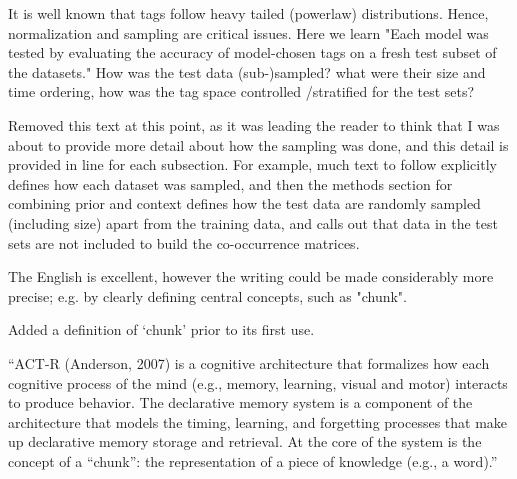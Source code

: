 \documentclass[answers,12pt]{exam}
\begin{document}
\begin{questions}
\begin{solution}
\end{solution}

\question It is well known that tags follow heavy tailed (powerlaw) distributions. Hence, normalization and sampling are critical issues. Here we learn "Each model was tested by evaluating the accuracy of model-chosen tags on a fresh test subset of the datasets." How was the test data (sub-)sampled? what were their size and time ordering, how was the tag space controlled /stratified for the test sets?

\begin{solution}
Removed this text at this point, as it was leading the reader to think that I was about to provide more detail about how the sampling was done, and this detail is provided in line for each subsection. For example, much text to follow explicitly defines how each dataset was sampled, and then the methods section for combining prior and context defines how the test data are randomly sampled (including size) apart from the training data, and calls out that data in the test sets are not included to build the co-occurrence matrices.

\end{solution}

\question The English is excellent, however the writing could be made considerably more precise; e.g. by clearly defining central concepts, such as "chunk".

\begin{solution}
Added a definition of ‘chunk’ prior to its first use.

``ACT-R (Anderson, 2007) is a cognitive architecture that formalizes how each cognitive process of the mind (e.g., memory, learning, visual and motor) interacts to produce behavior. The declarative memory system is a component of the architecture that models the timing, learning, and forgetting processes that make up declarative memory storage and retrieval. At the core of the system is the concept of a “chunk”: the representation of a piece of knowledge (e.g., a word).''

\end{solution}

\end{questions}
\end{document}
